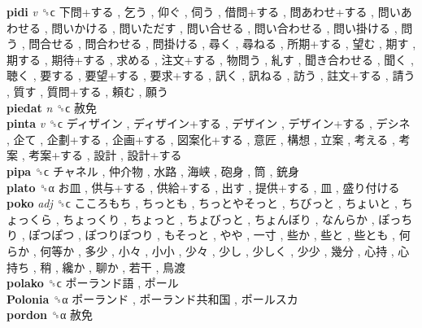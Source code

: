 \textbf{pidi} \emph{v}  ␝ϲ   下問+する ,  乞う ,  仰ぐ ,  伺う ,  借問+する ,  問あわせ+する ,  問いあわせる ,  問いかける ,  問いただす ,  問い合せる ,  問い合わせる ,  問い掛ける ,  問う ,  問合せる ,  問合わせる ,  問掛ける ,  尋く ,  尋ねる ,  所期+する ,  望む ,  期す ,  期する ,  期待+する ,  求める ,  注文+する ,  物問う ,  糺す ,  聞き合わせる ,  聞く ,  聴く ,  要する ,  要望+する ,  要求+する ,  訊く ,  訊ねる ,  訪う ,  註文+する ,  請う ,  質す ,  質問+する ,  頼む ,  願う   \\
\textbf{piedat} \emph{n}  ␝ϲ   赦免   \\
\textbf{pinta} \emph{v}  ␝ϲ   ディザイン ,  ディザイン+する ,  デザイン ,  デザイン+する ,  デシネ ,  企て ,  企劃+する ,  企画+する ,  図案化+する ,  意匠 ,  構想 ,  立案 ,  考える ,  考案 ,  考案+する ,  設計 ,  設計+する   \\
\textbf{pipa} ␝ϲ   チャネル ,  仲介物 ,  水路 ,  海峡 ,  砲身 ,  筒 ,  銃身   \\
\textbf{plato} ␝α   お皿 ,  供与+する ,  供給+する ,  出す ,  提供+する ,  皿 ,  盛り付ける   \\
\textbf{poko} \emph{adj}  ␝ϲ   こころもち ,  ちっとも ,  ちっとやそっと ,  ちびっと ,  ちょいと ,  ちょっくら ,  ちょっくり ,  ちょっと ,  ちょびっと ,  ちょんぼり ,  なんらか ,  ぽっちり ,  ぽつぽつ ,  ぽつりぽつり ,  もそっと ,  やや ,  一寸 ,  些か ,  些と ,  些とも ,  何らか ,  何等か ,  多少 ,  小々 ,  小小 ,  少々 ,  少し ,  少しく ,  少少 ,  幾分 ,  心持 ,  心持ち ,  稍 ,  纔か ,  聊か ,  若干 ,  鳥渡   \\
\textbf{polako} ␝ϲ   ポーランド語 ,  ポール   \\
\textbf{Polonia} ␝α   ポーランド ,  ポーランド共和国 ,  ポールスカ   \\
\textbf{pordon} ␝α   赦免   \\
